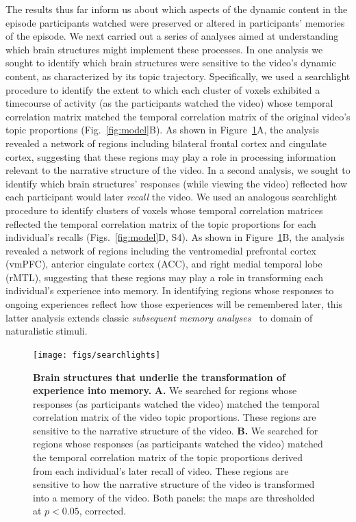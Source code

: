 \documentclass{article}
\newcommand{\corrmats}{S4}
\begin{document}
The results thus far inform us about which aspects of the dynamic content in the episode participants watched were preserved or altered in participants' memories of the episode.  We next carried out a series of analyses aimed at understanding which brain structures might implement these processes.  In one analysis we sought to identify which brain structures were sensitive to the video's dynamic content, as characterized by its topic trajectory.  Specifically, we used a searchlight procedure to identify the extent to which each cluster of voxels exhibited a timecourse of activity (as the participants watched the video) whose temporal correlation matrix matched the temporal correlation matrix of the original video's topic proportions (Fig.~\ref{fig:model}B).  As shown in Figure~\ref{fig:brainz}A, the analysis revealed a network of regions including bilateral frontal cortex and cingulate cortex, suggesting that these regions may play a role in processing information relevant to the narrative structure of the video.  In a second analysis, we sought to identify which brain structures' responses (while viewing the video) reflected how each participant would later \textit{recall} the video.  We used an analogous searchlight procedure to identify clusters of voxels whose temporal correlation matrices reflected the temporal correlation matrix of the topic proportions for each individual's recalls (Figs.~\ref{fig:model}D, \corrmats).  As shown in Figure~\ref{fig:brainz}B, the analysis revealed a network of regions including the ventromedial prefrontal cortex (vmPFC), anterior cingulate cortex (ACC), and right medial temporal lobe (rMTL), suggesting that these regions may play a role in transforming each individual's experience into memory.  In identifying regions whose responses to ongoing experiences reflect how those experiences will be remembered later, this latter analysis extends classic \textit{subsequent memory analyses}~\citep[e.g.,][]{PallWagn02} to domain of naturalistic stimuli.

\begin{figure}[t]
\centering
\texttt{[image: figs/searchlights]}
\caption{\small \textbf{Brain structures that underlie the transformation of experience into memory.} \textbf{A.} We searched for regions whose responses (as participants watched the video) matched the temporal correlation matrix of the video topic proportions.  These regions are sensitive to the narrative structure of the video.  \textbf{B.} We searched for regions whose responses (as participants watched the video) matched the temporal correlation matrix of the topic proportions derived from each individual's later recall of video.  These regions are sensitive to how the narrative structure of the video is transformed into a memory of the video.  Both panels: the maps are thresholded at $p < 0.05$, corrected.}
\label{fig:brainz}
\end{figure}
\end{document}
